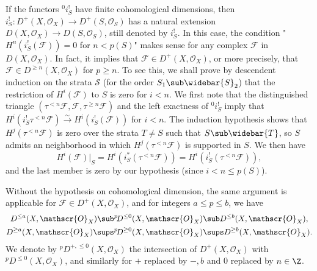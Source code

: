 \begin{remark}\label{stratified space perverse condition finite cohomology dim}
If the functors ${^0i_S^!}$ have finite cohomological dimensions, then $i_S^!:D^+(X,\mathscr{O}_X)\to D^+(S,\mathscr{O}_S)$ has a natural extension $D(X,\mathscr{O}_X)\to D(S,\mathscr{O}_S)$, still denoted by $i_S^!$. In this case, the condition "$H^n(i_S^!(\mathscr{F}))=0$ for $n<p(S)$" makes sense for any complex $\mathscr{F}$ in $D(X,\mathscr{O}_X)$. In fact, it implies that $\mathscr{F}\in D^+(X,\mathscr{O}_X)$, or more precisely, that $\mathscr{F}\in D^{\geq n}(X,\mathscr{O}_X)$ for $p\geq n$. To see this, we shall prove by descendent induction on the strata $\mathcal{S}$ (for the order $S_1\sub\widebar{S}_2$) that the restriction of $H^i(\mathscr{F})$ to $S$ is zero for $i<n$. We first note that the distinguished triangle $(\tau^{<n}\mathscr{F},\mathscr{F},\tau^{\geq n}\mathscr{F})$ and the left exactness of ${^0i_S^!}$ imply that $H^i(i_S^!\tau^{<n}\mathscr{F})\stackrel{\sim}{\to} H^i(i_S^!(\mathscr{F}))$ for $i<n$. The induction hypothesis shows that $H^j(\tau^{<n}\mathscr{F})$ is zero over the strata $T\neq S$ such that $S\sub\widebar{T}$, so $S$ admits an neighborhood in which $H^j(\tau^{<n}\mathscr{F})$ is supported in $S$. We then have
\[H^i(\mathscr{F})|_S=H^i(i_S^*(\tau^{<n}\mathscr{F}))=H^i(i_S^!(\tau^{<n}\mathscr{F})),\]
and the last member is zero by our hypothesis (since $i<n\leq p(S)$).\par
Without the hypothesis on cohomological dimension, the same argument is applicable for $\mathscr{F}\in D^+(X,\mathscr{O}_X)$, and for integers $a\leq p\leq b$, we have
\begin{align}
D^{\leq a}(X,\mathscr{O}_X)\sub &{^p\!D^{\leq 0}}(X,\mathscr{O}_X)\sub D^{\leq b}(X,\mathscr{O}_X),\label{stratified space perverse condition inclusion-1}\\
D^{\geq a}(X,\mathscr{O}_X)\sups &{^p\!D^{\geq 0}}(X,\mathscr{O}_X)\sups D^{\geq b}(X,\mathscr{O}_X).\label{stratified space perverse condition inclusion-2}
\end{align}
We denote by ${^p\!D^{+,\leq 0}}(X,\mathscr{O}_X)$ the intersection of $D^+(X,\mathscr{O}_X)$ with ${^p\!D^{\leq 0}}(X,\mathscr{O}_X)$, and similarly for $+$ replaced by $-,b$ and $0$ replaced by $n\in\Z$.
\end{remark}

